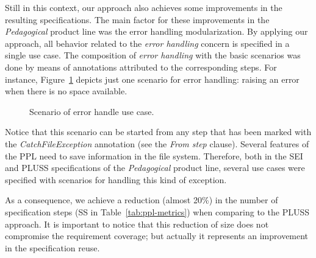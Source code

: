 \documentclass{acm_proc_article-sp}
\begin{document}
Still in this context, our approach also achieves some improvements in the resulting specifications. The main factor for these improvements in the \emph{Pedagogical} product line was the error handling modularization. By applying our approach, all behavior related to the \emph{error handling} concern is specified in a single use case. The composition of \emph{error handling} with the basic scenarios was done by means of annotations attributed to the corresponding steps. For instance, Figure~\ref{fig:error-handle} depicts just one scenario for error handling: raising  an error when there is no space available. 

\begin{figure}[h]
\caption{Scenario of error handle use case.}
\label{fig:error-handle}
\end{figure}
    
Notice that this scenario can be started from any step that has been marked with the \emph{CatchFileException} annotation (see the \emph{From step} clause). Several features of the PPL need to save information in the file system. Therefore, both in the SEI and PLUSS specifications of the \emph{Pedagogical} product line, several use cases were specified with scenarios for handling this kind of exception.

As a consequence, we achieve a reduction (almost 20\%) in the number of specification steps (SS in Table~\ref{tab:ppl-metrics}) when comparing to the PLUSS approach. It is important to notice that this reduction of size does not compromise the requirement coverage; but actually it represents an improvement in the specification reuse.
\end{document}
